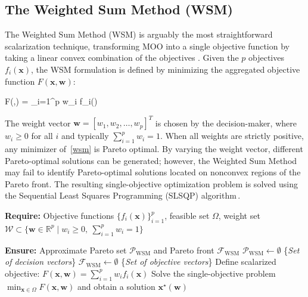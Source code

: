 \documentclass[11pt,pdflatex,sn-mathphys-ay]{sn-jnl}%
\theoremstyle{definition}
\theoremstyle{thmstyleone}%
\theoremstyle{thmstyletwo}%
\theoremstyle{thmstylethree}%
\newcommand{\bb}[1]{\mathbf{#1}}
\begin{document}
\begin{appendices}
		\subsection{The Weighted Sum Method (WSM)}
		The Weighted Sum Method (WSM) is arguably the most straightforward scalarization technique, transforming MOO into a single objective function by taking a linear convex combination of the objectives \cite{marler2004survey, van2012evaluation,gass1955computational}. 
		Given the $p$ objectives $f_i(\bm{x})$, the WSM formulation is defined by minimizing the aggregated objective function $F(\bm{x},\bb{w})$:
		\begin{mini!}{ \in \Omega}{F(,\bb{w}) = \sum_{i=1}^{p} w_i f_i()}{}{}\label{wsm}
		\end{mini!}
		The weight vector $\mathbf{w} = [w_1, w_2, \dots, w_p]^T$ is chosen by the decision-maker, where $w_i \geq 0$ for all $i$ and typically $\sum_{i=1}^{p} w_i = 1$. When all weights are strictly positive, any minimizer of~\eqref{wsm} is Pareto optimal. By varying the weight vector, different Pareto-optimal solutions can be generated; however, the Weighted Sum Method may fail to identify Pareto-optimal solutions located on nonconvex regions of the Pareto front. The resulting single-objective optimization problem is solved using the Sequential Least Squares Programming (SLSQP) algorithm\,\cite{nocedal2006numerical}.
		\begin{algorithm}[h!]
			\caption{Weighted Sum Method (WSM) for Pareto Front Generation}
			\label{alg:wsm}
			\begin{algorithmic}[1]
				\item[]  \hspace{-2em} \textbf{Require:} Objective functions $\{f_i(\bm{x})\}_{i=1}^p$, feasible set $\Omega$, 
				weight set $\mathcal{W} \subset \{\bm{w} \in \mathbb{R}^p \mid w_i \ge 0, \ \sum_{i=1}^p w_i = 1\}$
				\item[] \hspace{-2em} \textbf{Ensure:} Approximate Pareto set $\mathcal{P}_{\text{WSM}}$ and Pareto front $\mathcal{F}_{\text{WSM}}$
				\STATE $\mathcal{P}_{\text{WSM}} \gets \emptyset$ \{\emph{Set of decision vectors}\}
				\STATE $\mathcal{F}_{\text{WSM}} \gets \emptyset$ \{\emph{Set of objective vectors}\}
				\STATE Define scalarized objective:
				$F(\bm{x},\bm{w}) = \sum_{i=1}^{p} w_i f_i(\bm{x})$
				\STATE Solve the single-objective problem
				$\min_{\bm{x} \in \Omega} F(\bm{x},\bm{w})$
				and obtain a solution $\bm{x}^{\star}(\bm{w})$

\end{algorithmic}
\end{algorithm}
\end{appendices}
\end{document}
